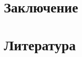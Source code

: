 \documentclass[12pt]{amsart}
\let\no\textnumero
\theoremstyle{definition}
\begin{document}
\section{Заключение}
    

\section{Литература}
\printbibliography[heading=none]



\end{document}
